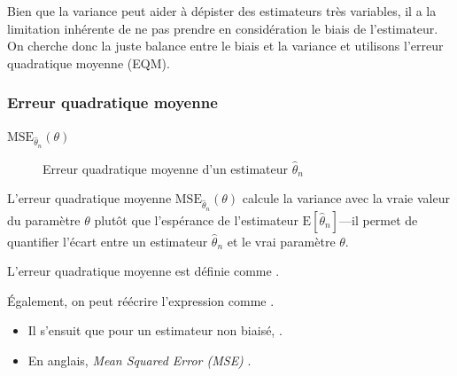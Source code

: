 \documentclass[french]{article}
\begin{document}
\begin{multicols*}{2}
\begin{rappel_enhanced}[Limitations]
Bien que la variance peut aider à dépister des estimateurs très variables, il a la limitation inhérente de ne pas prendre en considération le biais de l'estimateur. On cherche donc la juste balance entre le biais et la variance et utilisons l'erreur quadratique moyenne (EQM). 
\end{rappel_enhanced}



\columnbreak
\subsubsection{Erreur quadratique moyenne}\label{subsubsec:EQMQuality}
\begin{distributions}[Notation]
\begin{description}
	\item[$\text{MSE}_{\hat{\theta}_{n}}(\theta)$]	Erreur quadratique moyenne d'un estimateur $\hat{\theta}_{n}$
\end{description}
\end{distributions}

\begin{rappel_enhanced}[Motivation]
L'erreur quadratique moyenne $\text{MSE}_{\hat{\theta}_{n}}(\theta)$ calcule la variance avec la vraie valeur du paramètre $\theta$ plutôt que l'espérance de l'estimateur $\text{E}[\hat{\theta}_{n}]$---il permet de quantifier l'écart entre un estimateur $\hat{\theta}_{n}$ et le vrai paramètre $\theta$.
\end{rappel_enhanced}

\begin{definitionNOHFILL}
L'erreur quadratique moyenne est définie comme .

\bigskip

Également, on peut réécrire l'expression comme .

\bigskip

\begin{itemize}
	\item	Il s'ensuit que pour un estimateur non biaisé, .
	\item	En anglais, \og \textit{Mean Squared Error (MSE)} \fg{}.
\end{itemize}
\end{definitionNOHFILL}



\end{multicols*}
\end{document}
